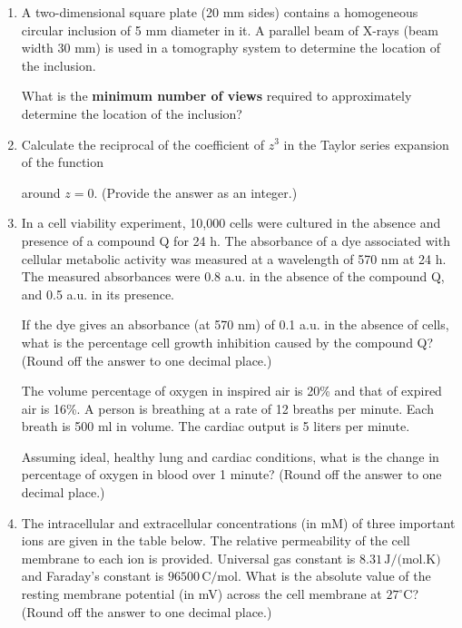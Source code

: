 \documentclass[journal]{IEEEtran}
\begin{document}
\begin{enumerate}
  
\hfill{}

\item 
A two-dimensional square plate (20 mm sides) contains a homogeneous circular inclusion of 5 mm diameter in it. A parallel beam of X-rays (beam width 30 mm) is used in a tomography system to determine the location of the inclusion. 

What is the \textbf{minimum number of views} required to approximately determine the location of the inclusion?
\hfill{}

\item 
Calculate the reciprocal of the coefficient of \( z^3 \) in the Taylor series expansion of the function 




around \( z = 0 \). (Provide the answer as an integer.)

\hfill{}

\item 
In a cell viability experiment, 10,000 cells were cultured in the absence and presence of a compound Q for 24 h. The absorbance of a dye associated with cellular metabolic activity was measured at a wavelength of 570 nm at 24 h. The measured absorbances were 0.8 a.u. in the absence of the compound Q, and 0.5 a.u. in its presence.

\vspace{0.5em}
If the dye gives an absorbance (at 570 nm) of 0.1 a.u. in the absence of cells, what is the percentage cell growth inhibition caused by the compound Q? (Round off the answer to one decimal place.)
\hfill{}


The volume percentage of oxygen in inspired air is 20\% and that of expired air is 16\%. A person is breathing at a rate of 12 breaths per minute. Each breath is 500 ml in volume. The cardiac output is 5 liters per minute.

\vspace{0.5em}
Assuming ideal, healthy lung and cardiac conditions, what is the change in percentage of oxygen in blood over 1 minute? (Round off the answer to one decimal place.)

\hfill{}

\item 
The intracellular and extracellular concentrations (in mM) of three important ions are given in the table below. The relative permeability of the cell membrane to each ion is provided. Universal gas constant is \( 8.31 \, \text{J/(mol.K)} \) and Faraday's constant is \( 96500 \, \text{C/mol} \).
What is the absolute value of the resting membrane potential (in mV) across the cell membrane at \( 27^\circ \text{C} \)? (Round off the answer to one decimal place.)


\end{enumerate}
\end{document}
